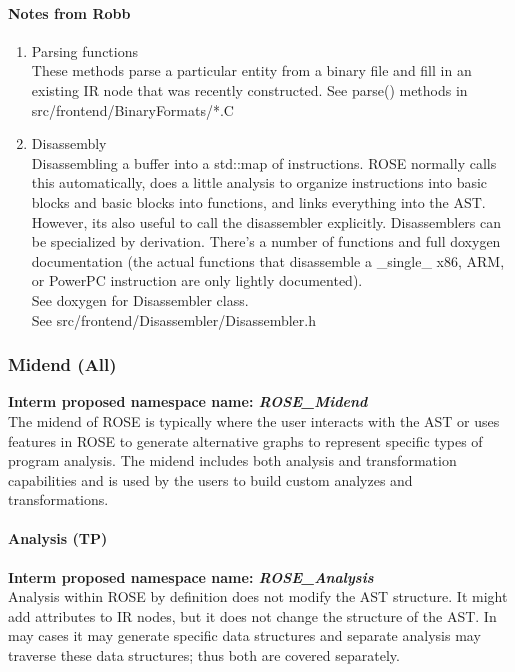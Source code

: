 \paragraph{Notes from Robb}
\begin{enumerate}
	\item Parsing functions \\
   These methods parse a particular entity from a binary file and
   fill in an existing IR node that was recently constructed.
   See parse() methods in src/frontend/BinaryFormats/*.C
   \item Disassembly \\
   Disassembling a buffer into a std::map of instructions.  ROSE
   normally calls this automatically, does a little analysis to
   organize instructions into basic blocks and basic blocks into
   functions, and links everything into the AST. However, its
   also useful to call the disassembler explicitly. Disassemblers
   can be specialized by derivation. There's a number of
   functions and full doxygen documentation (the actual functions
   that disassemble a \_single\_ x86, ARM, or PowerPC instruction
   are only lightly documented). \\
   See doxygen for Disassembler class. \\
   See src/frontend/Disassembler/Disassembler.h
\end{enumerate}


\subsubsection{Midend (All)}
{\bf Interm proposed namespace name: {\em ROSE\_Midend}} \\
   The midend of ROSE is typically where the user interacts with the AST
or uses features in ROSE to generate alternative graphs to represent
specific types of program analysis. The midend includes both analysis
and transformation capabilities and is used by the users to build 
custom analyzes and transformations.

\paragraph{Analysis (TP)}
{\bf Interm proposed namespace name: {\em ROSE\_Analysis}} \\
   Analysis within ROSE by definition does not modify the AST structure.
It might add attributes to IR nodes, but it does not change the structure 
of the AST.  In may cases it may generate specific data structures and
separate analysis may traverse these data structures; thus both are covered
separately.

